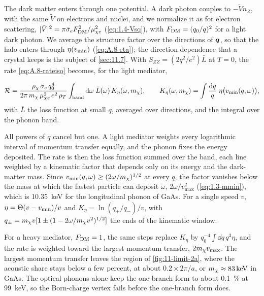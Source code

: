 The dark matter enters through one potential. A dark photon couples to $-\tilde V n_Z$, with the same $\tilde V$ on electrons and nuclei, and we normalize it as for electron scattering, $|\tilde V|^2 = \pi\bar{\sigma}_{e}F_{\mathrm{DM}}^2/\mu_{\chi e}^2$ (\cref{eq:1.4-Vsq}), with $F_{\mathrm{DM}} = (q_0/q)^2$ for a light dark photon. We average the structure factor over the directions of $\bm{q}$, so that the halo enters through $\eta(v_{\mathrm{min}})$ (\cref{eq:A.8-eta}); the direction dependence that a crystal keeps is the subject of \cref{sec:11.7}. With $S_{ZZ} = (2q^2/e^2)\bar L$ at $T = 0$, the rate \cref{eq:A.8-rateiso} becomes, for the light mediator,
\begin{keyresult}
\begin{equation}
  \mathcal{R} = \frac{\rho_\chi\,\bar{\sigma}_{e}\,q_0^4}{2\pi\,m_{\chi}\,\mu_{\chi e}^2\,e^2\,\rho_T}\int_{\mathrm{band}}\mathrm{d}\omega\;\bar L(\omega)\,K_\eta(\omega,m_{\chi}) ,
  \qquad
  K_\eta(\omega,m_{\chi}) = \int\frac{\mathrm{d} q}{q}\;\eta\bigl(v_{\mathrm{min}}(q,\omega)\bigr) ,
  \label{eq:11.2-rate}
\end{equation}
with $\bar L$ the loss function at small $q$, averaged over directions, and the integral over the phonon band.
\end{keyresult}
\noindent All powers of $q$ cancel but one. A light mediator weights every logarithmic interval of momentum transfer equally, and the phonon fixes the energy deposited. The rate is then the loss function summed over the band, each line weighted by a kinematic factor that depends only on its energy and the dark-matter mass. Since $v_{\mathrm{min}}(q,\omega) \ge (2\omega/m_{\chi})^{1/2}$ at every $q$, the factor vanishes below the mass at which the fastest particle can deposit $\omega$, $2\omega/v_{\mathrm{max}}^2$ (\cref{eq:1.3-mmin}), which is \SI{10.35}{keV} for the longitudinal phonon of GaAs. For a single speed $v$, $\eta = \Theta(v - v_{\mathrm{min}})/v$ and $K_\eta = \ln(q_+/q_-)/v$, with $q_\pm = m_{\chi} v[1 \pm (1 - 2\omega/m_{\chi} v^2)^{1/2}]$ the ends of the kinematic window.

For a heavy mediator, $F_{\mathrm{DM}} = 1$, the same steps replace $K_\eta$ by $q_0^{-4}\int\dd q\,q^3\eta$, and the rate is weighted toward the largest momentum transfer, $2m_{\chi} v_{\mathrm{max}}$. The largest momentum transfer leaves the region of \cref{fig:11-limit-2a}, where the acoustic share stays below a few percent, at about $0.2\times2\pi/a$, or $m_{\chi} \approx \SI{83}{keV}$ in GaAs. The optical phonons alone keep the one-branch form to about \SI{0.1}{\percent} at \SI{99}{keV}, so the Born-charge vertex fails before the one-branch form does.

